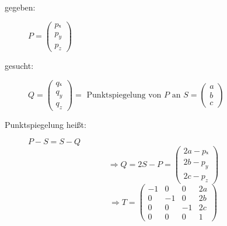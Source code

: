 \documentclass[a4paper,12pt]{scrartcl}
\newcommand{\pmat}[1]{\begin{pmatrix}#1\end{pmatrix}}
\begin{document}
 

\begin{description}
\item[gegeben:] $P = \pmat{pₓ \\ p_y \\ p_z}$
\item[gesucht:] $Q = \pmat{qₓ \\ q_y \\ q_z} =
  \text{ Punktspiegelung von $P$ an $S = \pmat{a \\ b \\ c}$}$
\item[Punktspiegelung heißt:] $P - S = S - Q$
  \[ ⇒ Q = 2S - P = \pmat{2a - pₓ \\ 2b - p_y \\ 2c - p_z} \]
  \[ ⇒ T = \pmat{-1 & 0 & 0 & 2a \\ 0 & -1 & 0 & 2b \\ 0 & 0 & -1 & 2c \\ 0 & 0 & 0 & 1} \]
\end{description}
\end{document}
